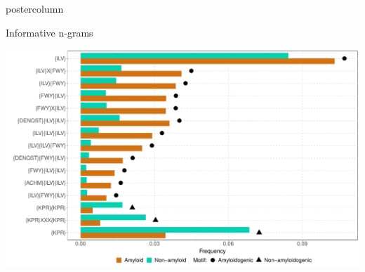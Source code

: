 \documentclass[final]{beamer}\usepackage[]{graphicx}\usepackage[]{color}
\makeatletter
\def\maxwidth{ %
  \ifdim\Gin@nat@width>\linewidth
    \linewidth
  \else
    \Gin@nat@width
  \fi
}
\newenvironment{knitrout}{}{} %
\makeatother
\begin{document}
\begin{frame}
\begin{columns}
\begin{column}{.53\textwidth}
\begin{beamercolorbox}[center,wd=\textwidth]{postercolumn}
\begin{minipage}[T]{.95\textwidth}
{%
%     
%     
% 
% 
% 
% 
%       

\vfill

\begin{block}{Informative n-grams}
\begin{knitrout}
\color{fgcolor}

{\centering \includegraphics[width=\maxwidth]{figure/unnamed-chunk-1-1} 

}



\end{knitrout}


\end{block}}
\end{minipage}
\end{beamercolorbox}
\end{column}
\end{columns}
\end{frame}
\end{document}
